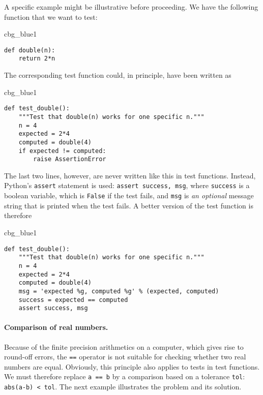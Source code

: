 \documentclass[graybox,sectrefs,envcountresetchap,open=right,final]{svmonodo}
\newenvironment{_cod_tight}[1]{
   \def\FrameCommand{\colorbox{#1}}
   \FrameRule0.6pt\MakeFramed {\FrameRestore}\vskip3mm}
   {\vskip0mm\endMakeFramed}
\newenvironment{cod}[1]{
\bgroup\rmfamily
\fboxsep=0mm\relax
\begin{_cod_tight}{#1}
\list{}{\parsep=-2mm\parskip=0mm\topsep=0pt\leftmargin=2mm
\rightmargin=2\leftmargin\leftmargin=4pt\relax}
\item\relax}
{\endlist\end{_cod_tight}\egroup}
\begin{document}
\noindent
A specific example might be illustrative before proceeding.
We have the following function that we want to test:

\begin{cod}{cbg_blue1}\begin{Verbatim}[numbers=none,fontsize=\fontsize{9pt}{9pt},baselinestretch=0.95,xleftmargin=2mm]
def double(n):
    return 2*n
\end{Verbatim}
\end{cod}
\noindent
The corresponding test function could, in principle, have been written
as

\begin{cod}{cbg_blue1}\begin{Verbatim}[numbers=none,fontsize=\fontsize{9pt}{9pt},baselinestretch=0.95,xleftmargin=2mm]
def test_double():
    """Test that double(n) works for one specific n."""
    n = 4
    expected = 2*4
    computed = double(4)
    if expected != computed:
        raise AssertionError
\end{Verbatim}
\end{cod}
\noindent
The last two lines, however, are never written like this in test functions.
Instead, Python's \texttt{assert} statement is used: \texttt{assert success, msg}, where
\texttt{success} is a boolean variable, which is \texttt{False} if the test fails, and
\texttt{msg} is \emph{an optional} message string that is printed when the test fails.
A better version of the test function is therefore

\begin{cod}{cbg_blue1}\begin{Verbatim}[numbers=none,fontsize=\fontsize{9pt}{9pt},baselinestretch=0.95,xleftmargin=2mm]
def test_double():
    """Test that double(n) works for one specific n."""
    n = 4
    expected = 2*4
    computed = double(4)
    msg = 'expected %g, computed %g' % (expected, computed)
    success = expected == computed
    assert success, msg
\end{Verbatim}
\end{cod}
\noindent

\paragraph{Comparison of real numbers.}
Because of the finite precision arithmetics on a computer, which gives
rise to round-off errors, the \texttt{==} operator is not suitable for
checking whether two real numbers are equal. Obviously, this principle
also applies to tests in test functions.
We must therefore replace \texttt{a == b} by a comparison
based on a tolerance \texttt{tol}: \texttt{abs(a-b) < tol}. The next example illustrates
the problem and its solution.
\end{document}
